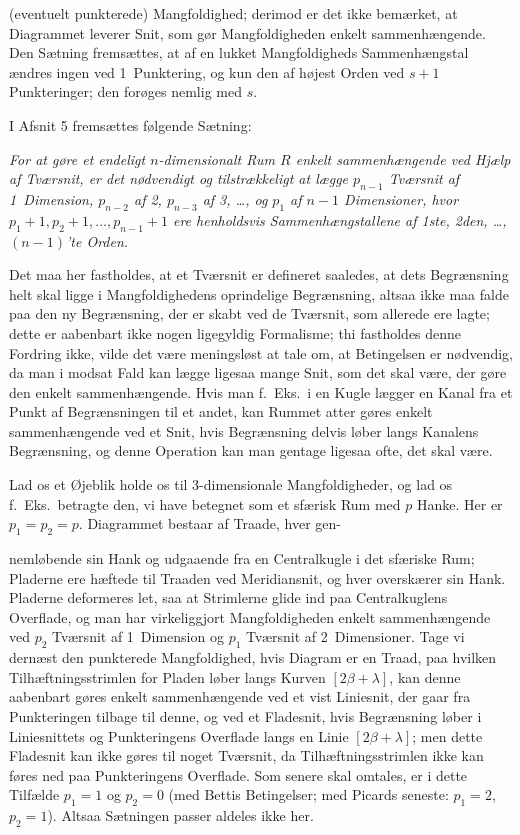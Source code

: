 \documentclass{article}
\begin{document}
(eventuelt punkterede) Mangfoldighed; derimod er det ikke bemærket, at Diagrammet leverer Snit, som gør Mangfoldigheden enkelt sammenhængende. Den Sætning fremsættes, at af en lukket Mangfoldigheds Sammenhængstal ændres ingen ved 1~Punktering, og kun den af højest Orden ved $s + 1$ Punkteringer; den forøges nemlig med $s$.

I Afsnit 5 fremsættes følgende Sætning:

\emph{For at gøre et endeligt $n$-dimensionalt Rum $R$ enkelt sammenhængende ved Hjælp af Tværsnit, er det nødvendigt og tilstrækkeligt at lægge $p_{n-1}$ Tværsnit af 1~Dimension, $p_{n-2}$ af 2, $p_{n-3}$ af 3, \dots, og $p_1$ af $n - 1$ Dimensioner, hvor $p_1 + 1, p_2 + 1, \dots, p_{n-1} + 1$ ere henholdsvis Sammenhængstallene af 1ste, 2den, \dots, $(n - 1)$'te Orden.}

Det maa her fastholdes, at et Tværsnit er defineret saaledes, at dets Begrænsning helt skal ligge i Mangfoldighedens oprindelige Begrænsning, altsaa ikke maa falde paa den ny Begrænsning, der er skabt ved de Tværsnit, som allerede ere lagte; dette er aabenbart ikke nogen ligegyldig Formalisme; thi fastholdes denne Fordring ikke, vilde det være meningsløst at tale om, at Betingelsen er nødvendig, da man i modsat Fald kan lægge ligesaa mange Snit, som det skal være, der gøre den enkelt sammenhængende. Hvis man f.~Eks.\ i en Kugle lægger en Kanal fra et Punkt af Begrænsningen til et andet, kan Rummet atter gøres enkelt sammenhængende ved et Snit, hvis Begrænsning delvis løber langs Kanalens Begrænsning, og denne Operation kan man gentage ligesaa ofte, det skal være.

Lad os et Øjeblik holde os til 3-dimensionale Mangfoldigheder, og lad os f.~Eks.\ betragte den, vi have betegnet som et sfærisk Rum med $p$ Hanke. Her er $p_1 = p_2 = p$. Diagrammet bestaar af Traade, hver gen-

nemløbende sin Hank og udgaaende fra en Centralkugle i det sfæriske Rum; Pladerne ere hæftede til Traaden ved Meridiansnit, og hver overskærer sin Hank. Pladerne deformeres let, saa at Strimlerne glide ind paa Centralkuglens Overflade, og man har virkeliggjort Mangfoldigheden enkelt sammenhængende ved $p_2$ Tværsnit af 1~Dimension og $p_1$ Tværsnit af 2~Dimensioner. Tage vi dernæst den punkterede Mangfoldighed, hvis Diagram er en Traad, paa hvilken Tilhæftningsstrimlen for Pladen løber langs Kurven $[2\beta + \lambda]$, kan denne aabenbart gøres enkelt sammenhængende ved et vist Liniesnit, der gaar fra Punkteringen tilbage til denne, og ved et Fladesnit, hvis Begrænsning løber i Liniesnittets og Punkteringens Overflade langs en Linie $[2\beta + \lambda]$; men dette Fladesnit kan ikke gøres til noget Tværsnit, da Tilhæftningsstrimlen ikke kan føres ned paa Punkteringens Overflade. Som senere skal omtales, er i dette Tilfælde $p_1 = 1$ og $p_2 = 0$ (med Bettis Betingelser; med Picards seneste: $p_1 = 2$, $p_2 = 1$). Altsaa Sætningen passer aldeles ikke her.
\end{document}
